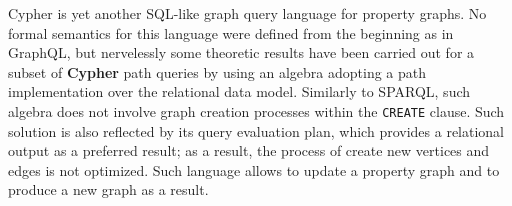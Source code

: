 
Cypher \cite{Neo4jMan,Robinson,CypherCheat} is yet another SQL-like graph query language for property graphs. No formal semantics for this
language were defined from the beginning as in GraphQL, but nervelessly some theoretic results have been carried out
for a subset of \textbf{Cypher} path queries \cite{Neo4jAlg} by using an algebra adopting a path implementation
over the relational data model. Similarly to SPARQL, such algebra does not involve graph creation processes within the \texttt{CREATE} clause. Such solution is also reflected by its query evaluation plan, which provides a relational output as a preferred result; as a result, the process of create new vertices and edges is not optimized.
Such language allows to update a property graph and to produce a new graph
as a result.

